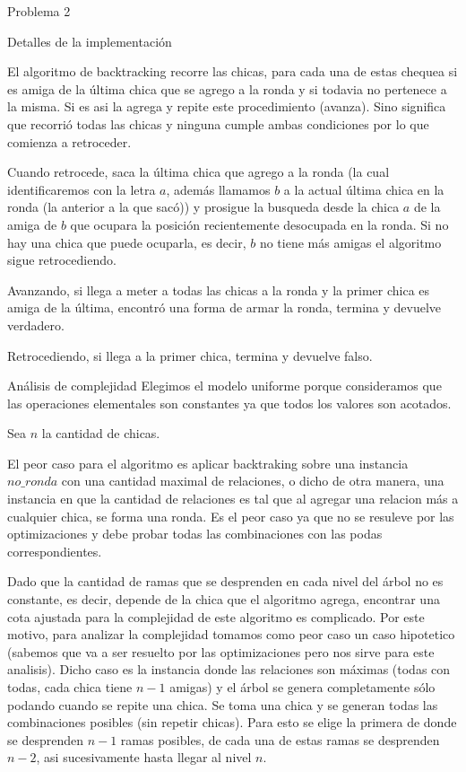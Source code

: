 \begin{section}{Problema 2}
\begin{subsection}{Detalles de la implementación}
\begin{itemize}
		\end{itemize}

		El algoritmo de backtracking recorre las chicas, para cada una de estas chequea si es amiga de la última chica que se agrego a la ronda y si todavia no pertenece a la misma. Si es asi la agrega y repite este procedimiento (avanza). Sino significa que recorrió todas las chicas y ninguna cumple ambas condiciones por lo que comienza a retroceder.

		Cuando retrocede, saca la última chica que agrego a la ronda (la cual identificaremos con la letra $a$, además llamamos $b$ a la actual última chica en la ronda (la anterior a la que sacó)) y prosigue la busqueda desde la chica $a$ de la amiga de $b$ que ocupara la posición recientemente desocupada en la ronda. Si no hay una chica que puede ocuparla, es decir, $b$ no tiene más amigas el algoritmo sigue retrocediendo.

		Avanzando, si llega a meter a todas las chicas a la ronda y la primer chica es amiga de la última, encontró una forma de armar la ronda, termina y devuelve verdadero.

		Retrocediendo, si llega a la primer chica, termina y devuelve falso.
	\end{subsection}
			
	\begin{subsection}{Análisis de complejidad}
			Elegimos el modelo uniforme porque consideramos que las operaciones elementales son constantes ya que todos los valores son acotados.\Pa
		
			Sea $n$ la cantidad de chicas.	
		
			El peor caso para el algoritmo es aplicar backtraking sobre una instancia $no\_ronda$ con una cantidad maximal de relaciones,
o dicho de otra manera, una instancia en que la cantidad de relaciones es tal que al agregar una relacion más a cualquier chica, se forma una ronda. Es el peor caso ya que no se resuleve por las optimizaciones y debe probar todas las combinaciones con las podas correspondientes.
			
			Dado que la cantidad de ramas que se desprenden en cada nivel del árbol no es constante, es decir, depende de la chica que el algoritmo agrega, encontrar una cota ajustada para la complejidad de este algoritmo es complicado. Por este motivo, para analizar la complejidad tomamos como peor caso un caso hipotetico (sabemos que va a ser resuelto por las optimizaciones pero nos sirve para este analisis). Dicho caso es la instancia donde las relaciones son máximas (todas con todas, cada chica tiene $n-1$ amigas) y el árbol se genera completamente sólo podando cuando se repite una chica. Se toma una chica y se generan todas las combinaciones posibles (sin repetir chicas). Para esto se elige la primera de donde se desprenden $n-1$ ramas posibles, de cada una de estas ramas se desprenden $n-2$, asi sucesivamente hasta llegar al nivel $n$.


\end{subsection}
\end{section}
